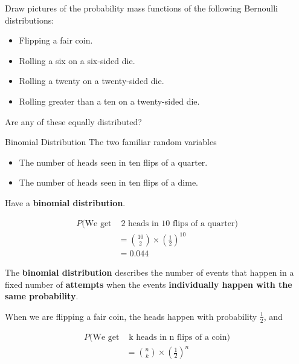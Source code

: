 %
\begin{frame}
Draw pictures of the probability mass functions of the following Bernoulli
distributions:

\begin{itemize}
\item Flipping a fair coin.
\item Rolling a six on a six-sided die.
\item Rolling a twenty on a twenty-sided die.
\item Rolling greater than a ten on a twenty-sided die.
\end{itemize}

Are any of these equally distributed?
\end{frame}
%

%
\begin{frame}{Binomial Distribution}
The two familiar random variables

\begin{itemize}
\item The number of heads seen in ten flips of a quarter.
\item The number of heads seen in ten flips of a dime.
\end{itemize}

Have a \textbf{binomial distribution}.
\end{frame}
%

%
\begin{frame}

\begin{align*}
P(\text{We get} & \text{ 2 heads in 10 flips of a quarter}) \\
%
&= {{10}\choose{2}} \times \left(\frac{1}{2} \right)^{10} \\
%
&= 0.044
\end{align*}

\end{frame}
%

%
\begin{frame}

The \textbf{binomial distribution} describes the number of events that happen in
a fixed number of \textbf{attempts} when the events \textbf{individually happen
with the same probability}.

\end{frame}
%

%
\begin{frame}
When we are flipping a fair coin, the heads happen with probability $\frac{1}{2}$, and

\begin{align*}
P(\text{We get} & \text{ k heads in n flips of a coin}) \\
%
&= {{n}\choose{k}} \times \left(\frac{1}{2} \right)^n
\end{align*}

\end{frame}
%

